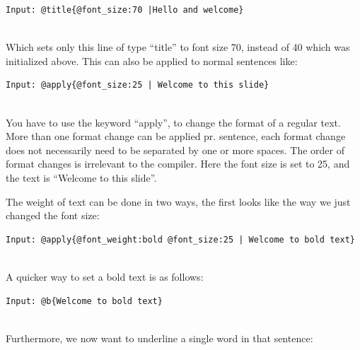 \begin{lstlisting}[frame=single]
Input: @title{@font_size:70 |Hello and welcome}
\end{lstlisting}

 \\

Which sets only this line of type ``title'' to font size 70, instead of 40 which was initialized above.
This can also be applied to normal sentences like:\\

\begin{lstlisting}[frame=single]
Input: @apply{@font_size:25 | Welcome to this slide}
\end{lstlisting}

 \\

You have to use the keyword ``apply'', to change the format of a regular text. More than one format change can be applied pr. sentence, each format change does not necessarily need to be separated by one or more spaces. The order of format changes is irrelevant to the compiler. Here the font size is set to 25, and the text is ``Welcome to this slide''.

The weight of text can be done in two ways, the first looks like the way we just changed the font size:\\

\begin{lstlisting}[frame=single]
Input: @apply{@font_weight:bold @font_size:25 | Welcome to bold text}
\end{lstlisting}

 \\

A quicker way to set a bold text is as follows:\\

\begin{lstlisting}[frame=single]
Input: @b{Welcome to bold text}
\end{lstlisting}

 \\

Furthermore, we now want to underline a single word in that sentence:\\

